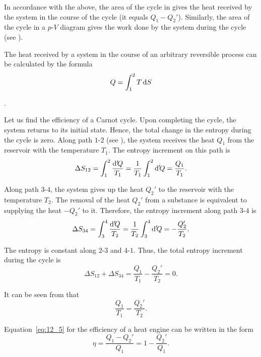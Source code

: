 In accordance with the above, the area of the cycle in  gives the heat received by the system in the course of the cycle (it equals $Q_1-Q_2'$). Similarly, the area of the cycle in a $p$-$V$ diagram gives the work done by the system during the cycle (see ).

The heat received by a system in the course of an arbitrary reversible process can be calculated by the formula
\begin{equation}\label{eq:12_9}
	Q = \int_{1}^{2} T\,\mathrm{d} S
\end{equation}

.

Let us find the efficiency of a Carnot cycle. Upon completing the cycle, the system returns to its initial state. Hence, the total change in the entropy during the cycle is zero. Along path $1$-$2$ (see ), the system receives the heat $Q_1$ from the reservoir with the temperature $T_1$. The entropy increment on this path is
\begin{equation*}
	\Delta S_{12} = \int_{1}^{2} \frac{\mathrm{d}'\!Q}{T_1} = \frac{1}{T_1} \int_{1}^{2} \mathrm{d}'\!Q = \frac{Q_1}{T_1}.
\end{equation*}

\noindent
Along path $3$-$4$, the system gives up the heat $Q_2'$ to the reservoir with the temperature $T_2$. The removal of the heat $Q_2'$ from a substance is equivalent to supplying the heat $-Q_2'$ to it. Therefore, the entropy increment along path $3$-$4$ is
\begin{equation*}
	\Delta S_{34} = \int_{3}^{4} \frac{\mathrm{d}'\!Q}{T_2} = \frac{1}{T_2} \int_{3}^{4} \mathrm{d}'\!Q = -\frac{Q_2'}{T_2}.
\end{equation*}

\noindent
The entropy is constant along $2$-$3$ and $4$-$1$. Thus, the total entropy increment during the cycle is
\begin{equation}\label{eq:12_10}
	\Delta S_{12} + \Delta S_{34} = \frac{Q_1}{T_1} - \frac{Q_2'}{T_2} = 0.
\end{equation}

\noindent
It can be seen from  that
\begin{equation}\label{eq:12_11}
	\frac{Q_1}{T_1} = \frac{Q_2'}{T_2}.
\end{equation}

Equation~\eqref{eq:12_5} for the efficiency of a heat engine can be written in the form
\begin{equation}\label{eq:12_12}
	\eta = \frac{Q_1-Q_2'}{Q_1} = 1 - \frac{Q_2'}{Q_1}.
\end{equation}

